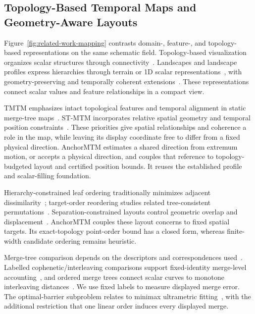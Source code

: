 \documentclass[review]{vgtc}
\begin{document}
\subsection{Topology-Based Temporal Maps and Geometry-Aware Layouts}
Figure~\ref{fig:related-work-mapping} contrasts domain-, feature-, and topology-based representations on the same schematic field. Topology-based visualization organizes scalar structures through connectivity~\cite{Heine:2016:Survey}. Landscapes and landscape profiles express hierarchies through terrain or 1D scalar representations~\cite{Weber:2007:TL,Oesterling:2013:TLP}, with geometry-preserving and temporally coherent extensions~\cite{Beketayev:2012:GPTL,Herick:2020:TCTL}. These representations connect scalar values and feature relationships in a compact view.

TMTM emphasizes intact topological features and temporal alignment in static merge-tree maps~\cite{Koepp:2023:TMTM}. ST-MTM incorporates relative spatial geometry and temporal position constraints~\cite{STMTM:2026}. These priorities give spatial relationships and coherence a role in the map, while leaving its display coordinate free to differ from a fixed physical direction. AnchorMTM estimates a shared direction from extremum motion, or accepts a physical direction, and couples that reference to topology-budgeted layout and certified position bounds. It reuses the established profile and scalar-filling foundation.

Hierarchy-constrained leaf ordering traditionally minimizes adjacent dissimilarity~\cite{BarJoseph:2001:OLO}; target-order reordering studies related tree-consistent permutations~\cite{Bulteau:2022:RT}. Separation-constrained layouts control geometric overlap and displacement~\cite{Dwyer:2006:IPSEP,Li:2019:SOI}. AnchorMTM couples these layout concerns to fixed spatial targets. Its exact-topology point-order bound has a closed form, whereas finite-width candidate ordering remains heuristic.

Merge-tree comparison depends on the descriptors and correspondences used~\cite{Yan:2021:Survey}. Labelled cophenetic/interleaving comparisons support fixed-identity merge-level accounting~\cite{Munch:2019:LINF,Gasparovic:2024:IID}, and ordered merge trees connect scalar curves to monotone interleaving distances~\cite{Beurskens:2025:OMT}. We use fixed labels to measure displayed merge error. The optimal-barrier subproblem relates to minimax ultrametric fitting~\cite{Farach:1995:RM}, with the additional restriction that one linear order induces every displayed merge.
\end{document}
